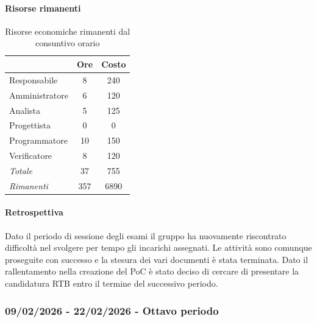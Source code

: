\documentclass[a4paper,12pt]{article}
\begin{document}
            \paragraph{Risorse rimanenti}
                \begin{table}[H]
                \centering
                \caption{Risorse economiche rimanenti dal consuntivo orario}
                \begin{tabular}{|l|c|c|}
                \hline
                    \rowcolor{lightgray}{\textbf{Ruolo}} & {\textbf{Ore}} & {\textbf{Costo}}\\
                \hline
                    Responsabile & 8 & 240\\
                \hline
                    Amministratore & 6 & 120\\
                \hline
                    Analista & 5 & 125\\
                \hline
                    Progettista & 0 & 0\\
                \hline
                    Programmatore & 10 & 150\\
                \hline
                    Verificatore & 8 & 120\\
                \hline
                    \rowcolor{lightgray}\textit{Totale} & 37 & 755\\
                \hline
                    \rowcolor{lightgray}\textit{Rimanenti} & 357 & 6890\\
                \hline
                \end{tabular}
                \end{table}
                
            \paragraph{Retrospettiva}
            Dato il periodo di sessione degli esami il gruppo ha nuovamente riscontrato difficoltà nel svolgere per tempo gli incarichi assegnati. Le attività sono comunque proseguite con successo e la stesura dei vari documenti è stata terminata. Dato il rallentamento nella creazione del PoC è stato deciso di cercare di presentare la candidatura RTB entro il termine del successivo periodo.
            
        \subsubsection{09/02/2026 - 22/02/2026 - Ottavo periodo}
\end{document}
